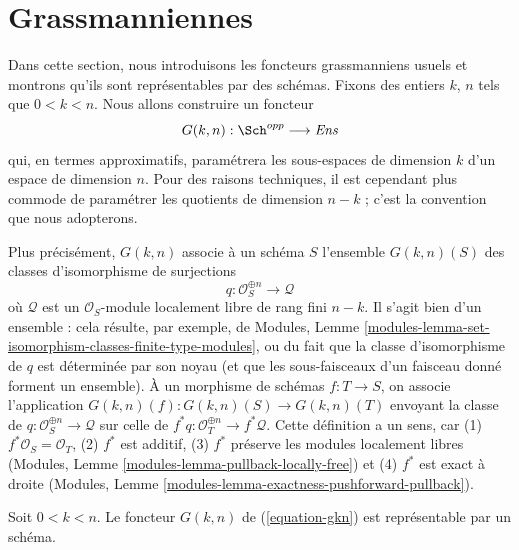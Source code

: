 \section{Grassmanniennes}
\label{section-grassmannian}

\noindent
Dans cette section, nous introduisons les foncteurs grassmanniens usuels et
montrons qu'ils sont représentables par des schémas. Fixons des entiers
$k$, $n$ tels que $0 < k < n$. Nous allons construire un foncteur
\begin{equation}
\label{equation-gkn}
G(k, n) : \Sch^{opp} \longrightarrow \textit{Ens}
\end{equation}
qui, en termes approximatifs, paramétrera les sous-espaces de dimension $k$
d'un espace de dimension $n$. Pour des raisons techniques, il est cependant
plus commode de paramétrer les quotients de dimension $n - k$ ; c'est la
convention que nous adopterons.

\medskip\noindent
Plus précisément, $G(k, n)$ associe à un schéma $S$ l'ensemble
$G(k, n)(S)$ des classes d'isomorphisme de surjections
$$
q : \mathcal{O}_S^{\oplus n} \longrightarrow \mathcal{Q}
$$
où $\mathcal{Q}$ est un $\mathcal{O}_S$-module localement libre de rang
fini $n - k$. Il s'agit bien d'un ensemble : cela résulte, par exemple,
de Modules,
Lemme \ref{modules-lemma-set-isomorphism-classes-finite-type-modules},
ou du fait que la classe d'isomorphisme de $q$ est déterminée par son noyau
(et que les sous-faisceaux d'un faisceau donné forment un ensemble).
À un morphisme de schémas $f : T \to S$, on associe l'application
$G(k, n)(f) : G(k, n)(S) \to G(k, n)(T)$ envoyant la classe de
$q : \mathcal{O}_S^{\oplus n} \longrightarrow \mathcal{Q}$ sur celle de
$f^*q : \mathcal{O}_T^{\oplus n} \longrightarrow f^*\mathcal{Q}$.
Cette définition a un sens, car (1) $f^*\mathcal{O}_S = \mathcal{O}_T$,
(2) $f^*$ est additif, (3) $f^*$ préserve les modules localement libres
(Modules, Lemme \ref{modules-lemma-pullback-locally-free}) et (4) $f^*$
est exact à droite (Modules,
Lemme \ref{modules-lemma-exactness-pushforward-pullback}).

\begin{lemma}
\label{lemma-gkn-representable}
Soit $0 < k < n$. Le foncteur $G(k, n)$ de (\ref{equation-gkn}) est
représentable par un schéma.
\end{lemma}

